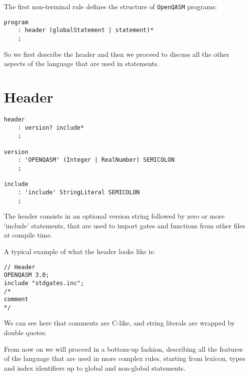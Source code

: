 \documentclass[12pt,a4paper]{report}
\theoremstyle{definition}
\theoremstyle{definition}
\theoremstyle{definition}
\begin{document}
The first non-terminal rule defines the structure of \texttt{OpenQASM} programs:

\begin{lstlisting}
program
    : header (globalStatement | statement)*
    ;
\end{lstlisting}

So we first describe the header and then we proceed to discuss all the other aspects of the language that are used in statements.




\section{Header}
\begin{lstlisting}
header
    : version? include*
    ;

version
    : 'OPENQASM' (Integer | RealNumber) SEMICOLON
    ;

include
    : 'include' StringLiteral SEMICOLON
    ;
\end{lstlisting}
The header consists in an optional version string followed by zero or more `include' statements, that are used to import gates and functions from other files at compile time.
\pagebreak

A typical example of what the header looks like is:
\begin{lstlisting}
// Header
OPENQASM 3.0;
include "stdgates.inc";
/*
comment
*/
\end{lstlisting}
We can see here that comments are C-like, and string literals are wrapped by double quotes.

From now on we will proceed in a bottom-up fashion, describing all the features of the language that are used in more complex rules, starting from lexicon, types and index identifiers up to global and non-global statements.
\\
\end{document}
